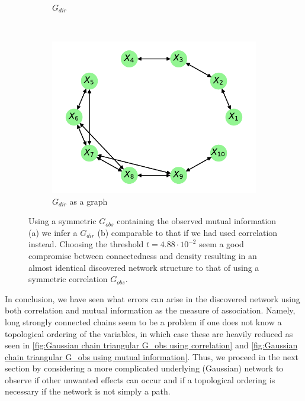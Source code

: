 \documentclass[../Thesis.tex]{subfiles}
\begin{document}
\begin{figure}[ht]
\begin{subfigure}[t]{0.49\textwidth}
        \caption{$G_{dir}$}
    \end{subfigure}
    \\[\baselineskip]
    \begin{subfigure}[t]{0.49\textwidth}
        \centering
        \includegraphics[width=.9\linewidth]{figures/Gaussian Chain Theoretical/Chain graph from symmetric G obs - MI - cutoff 4_88e-2.pdf}
        \caption{$G_{dir}$ as a graph}
    \end{subfigure}
    \caption{Using a symmetric $G_{obs}$ containing the observed mutual information (a) we infer a $G_{dir}$ (b) comparable to that if we had used correlation instead. Choosing the threshold $t = 4.88 \cdot 10^{-2}$ seem a good compromise between connectedness and density resulting in an almost identical discovered network structure to that of using a symmetric correlation $G_{obs}$.}
    \label{fig:Gaussian chain symmetric G_obs using mutual information}
\end{figure}

In conclusion, we have seen what errors can arise in the discovered network using both correlation and mutual information as the measure of association. Namely, long strongly connected chains seem to be a problem if one does not know a topological ordering of the variables, in which case these are heavily reduced  as seen in \autoref{fig:Gaussian chain triangular G_obs using correlation} and \autoref{fig:Gaussian chain triangular G_obs using mutual information}. Thus, we proceed in the next section by considering a more complicated underlying (Gaussian) network to observe if other unwanted effects can occur and if a topological ordering is necessary if the network is not simply a path.
\end{document}
